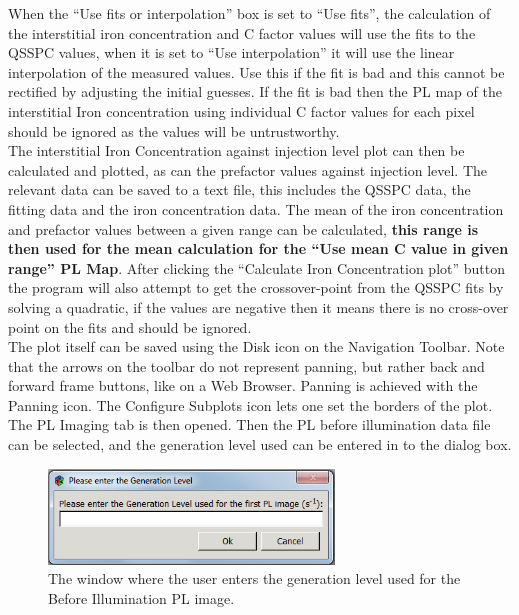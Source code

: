 \documentclass[final,a4paper,oneside,12pt]{article}
\begin{document}
When the ``Use fits or interpolation'' box is set to ``Use fits'', the calculation of the interstitial iron concentration and C factor values will use the fits to the QSSPC values, when it is set to ``Use interpolation'' it will use the linear interpolation of the measured values. Use this if the fit is bad and this cannot be rectified by adjusting the initial guesses. If the fit is bad then the PL map of the interstitial Iron concentration using individual C factor values for each pixel should be ignored as the values will be untrustworthy.
\\
The interstitial Iron Concentration against injection level plot can then be calculated and plotted, as can the prefactor values against injection level. The relevant data can be saved to a text file, this includes the QSSPC data, the fitting data and the iron concentration data. The mean of the iron concentration and prefactor values between a given range can be calculated, {\bf this range is then used for the mean calculation for the ``Use mean C value in given range'' PL Map}. After clicking the ``Calculate Iron Concentration plot'' button the program will also attempt to get the crossover-point from the QSSPC fits by solving a quadratic, if the values are negative then it means there is no cross-over point on the fits and should be ignored.
\\
The plot itself can be saved using the Disk icon on the Navigation Toolbar. Note that the arrows on the toolbar do not represent panning, but rather back and forward frame buttons, like on a Web Browser. Panning is achieved with the Panning icon. The Configure Subplots icon lets one set the borders of the plot.\\

The PL Imaging tab is then opened. Then the PL before illumination data file can be selected, and the generation level used can be entered in to the dialog box.

\begin{figure}[h!]
\includegraphics[height=1in]{2genlevel}
\caption{\label{figure2} The window where the user enters the generation level used for the Before Illumination PL image.}
\end{figure}
\end{document}
